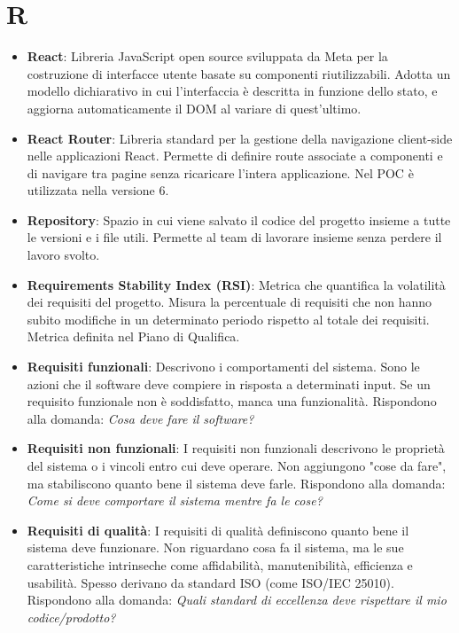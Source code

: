 \documentclass[11pt,a4paper]{article}
\begin{document}
\section*{R}
\begin{itemize}
\item \textbf{React}: Libreria JavaScript open source sviluppata da 
Meta per la costruzione di interfacce utente basate su componenti 
riutilizzabili. Adotta un modello dichiarativo in cui l'interfaccia è descritta in funzione dello stato, e aggiorna automaticamente il DOM al variare di quest'ultimo.

\item \textbf{React Router}: Libreria standard per la gestione della 
navigazione client-side nelle applicazioni React. Permette di definire route associate a componenti e di navigare tra pagine senza ricaricare l'intera applicazione. Nel POC è utilizzata nella versione 6.

\item \textbf{Repository}: Spazio in cui viene salvato il codice del progetto insieme a tutte le versioni e i file utili. Permette al team di lavorare insieme senza perdere il lavoro svolto.

\item \textbf{Requirements Stability Index (RSI)}: Metrica che quantifica la volatilità dei requisiti del progetto. Misura la percentuale di requisiti che non hanno subito modifiche in un determinato periodo rispetto al totale dei requisiti. Metrica definita nel Piano di Qualifica.

\item \textbf{Requisiti funzionali}: Descrivono i comportamenti del sistema. Sono le azioni che il software deve compiere in risposta a determinati input. Se un requisito funzionale non è soddisfatto, manca una funzionalità. Rispondono alla domanda: \textit{Cosa deve fare il software?}

\item \textbf{Requisiti non funzionali}: I requisiti non funzionali descrivono le proprietà del sistema o i vincoli entro cui deve operare. Non aggiungono "cose da fare", ma stabiliscono quanto bene il sistema deve farle. Rispondono alla domanda: \textit{Come si deve comportare il sistema mentre fa le cose?}

\item \textbf{Requisiti di qualità}: I requisiti di qualità definiscono quanto bene il sistema deve funzionare. Non riguardano cosa fa il sistema, ma le sue caratteristiche intrinseche come affidabilità, manutenibilità, efficienza e usabilità. Spesso derivano da standard ISO (come ISO/IEC 25010).
Rispondono alla domanda: \textit{Quali standard di eccellenza deve rispettare il mio codice/prodotto?}


\end{itemize}
\end{document}
